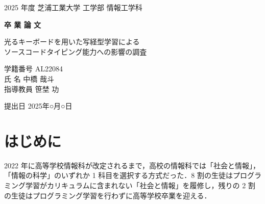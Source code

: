 \documentclass[uplatex, a4paper, 12pt]{jsarticle}
\begin{document}
\thispagestyle{empty} %

\begin{center}
\vspace*{2cm}

{\LARGE 2025 年度 芝浦工業大学 工学部 情報工学科}

\vspace{1.5cm}

{\Huge \textbf{卒 業 論 文}}

\vspace{2.5cm}

{\Large 光るキーボードを用いた写経型学習による\\[0.8em]
ソースコードタイピング能力への影響の調査}

\vspace{3cm}

{\Large
学籍番号  AL22084\\[1em]
氏    名  中橋 哉斗\\[1em]
指導教員  笹埜 功
}

\vfill

{\Large 提出日  2025年○月○日}

\end{center}

\clearpage

\section{はじめに}

2022 年に高等学校情報科が改定されるまで，高校の情報科では「社会と情報」，「情報の科学」のいずれか 1 科目を選択する方式だった．8 割の生徒はプログラミング学習がカリキュラムに含まれない「社会と情報」を履修し，残りの 2 割の生徒はプログラミング学習を行わずに高等学校卒業を迎える．
\end{document}
